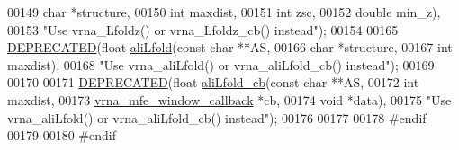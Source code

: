 \begin{DoxyCode}
00149                         \textcolor{keywordtype}{char}        *structure,
00150                         \textcolor{keywordtype}{int}         maxdist,
00151                         \textcolor{keywordtype}{int}         zsc,
00152                         \textcolor{keywordtype}{double}      min\_z),
00153 \textcolor{stringliteral}{"Use vrna\_Lfoldz() or vrna\_Lfoldz\_cb() instead"});
00154 
00165 \mbox{\hyperlink{_lfold_8h_aab347a3c03fbe8e7319551b9fa0cce4a}{DEPRECATED}}(\textcolor{keywordtype}{float} \mbox{\hyperlink{group__local__consensus__fold_ga864db0f9c428356d978ad0600aa9a8bc}{aliLfold}}(\textcolor{keyword}{const} \textcolor{keywordtype}{char} **AS,
00166                \textcolor{keywordtype}{char}       *structure,
00167                \textcolor{keywordtype}{int}        maxdist),
00168 \textcolor{stringliteral}{"Use vrna\_aliLfold() or vrna\_aliLfold\_cb() instead"});
00169 
00170 
00171 \mbox{\hyperlink{_lfold_8h_aab347a3c03fbe8e7319551b9fa0cce4a}{DEPRECATED}}(\textcolor{keywordtype}{float} \mbox{\hyperlink{_lfold_8h_af699f3dfc94a2b543721b6f8bcc72737}{aliLfold\_cb}}(\textcolor{keyword}{const} \textcolor{keywordtype}{char}                **AS,
00172                   \textcolor{keywordtype}{int}                       maxdist,
00173                   \mbox{\hyperlink{group__mfe__fold_ga4f3e5bc214ef803074ace313cb9571b4}{vrna\_mfe\_window\_callback}}  *cb,
00174                   \textcolor{keywordtype}{void}                      *data),
00175 \textcolor{stringliteral}{"Use vrna\_aliLfold() or vrna\_aliLfold\_cb() instead"});
00176 
00177 
00178 \textcolor{preprocessor}{#endif}
00179 
00180 \textcolor{preprocessor}{#endif}
\end{DoxyCode}
